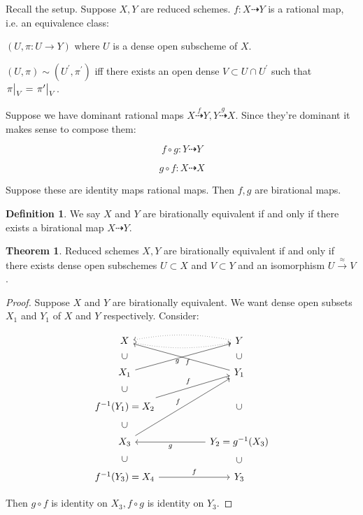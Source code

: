 \documentclass{article}
\theoremstyle{definition}
\newtheorem*{definition}{Definition}
\newtheorem{theorem}{Theorem}
\begin{document}
    Recall the setup. Suppose \(X, Y\) are reduced schemes. \(f: X \dashrightarrow Y\) is a rational map, i.e. an equivalence class:

    \((U, \pi: U \to Y)\) where \(U\) is a dense open subscheme of \(X\).

    \((U,\pi) \sim (U^{\prime}, \pi^{\prime})\) iff there exists an open dense \(V \subset U \cap U^{\prime}\) such that \(\eval{\pi}_{V} =\eval{\pi^{\prime}}_V\).

    Suppose we have dominant rational maps \(X \overset{f}{\dashrightarrow} Y, Y \overset{g}{\dashrightarrow} X\). Since they're dominant it makes sense to compose them:

    \[
        f \circ g \colon Y \dashrightarrow Y
    \]

    \[
        g \circ f\colon X \dashrightarrow X
    \]

    Suppose these are identity maps rational maps. Then \(f,g\) are birational maps.

    \begin{definition}
        We say \(X\) and \(Y\) are birationally equivalent if and only if there exists a birational map \(X \dashrightarrow Y\).
    \end{definition}

    \begin{theorem}
        Reduced schemes \(X, Y\) are birationally equivalent if and only if there exists dense open subschemes \(U \subset X\) and \(V \subset Y\) and an isomorphism \(U \xrightarrow{\approx} V\).
    \end{theorem}

    \begin{proof}
        Suppose \(X\) and \(Y\) are birationally equivalent. We want dense open subsets \(X_1\) and \(Y_1\) of \(X\) and \(Y\) respectively. Consider:
        
        \[
            \begin{tikzcd}[column sep = huge]
                X \ar[r, dotted, bend right = 10] & Y \ar[l, dotted, bend right = 10] \\
                X_1 \ar[u, "\subset", phantom, sloped] \ar[ru, "f"'] & Y_1 \ar[u, "\subset", phantom, sloped] \ar[ul,"g"] \\
                f^{-1} (Y_1)=X_2 \ar[u, "\subset", phantom, sloped] \ar[ru, "f"] \\ X_3 \ar[u, "\subset", phantom, sloped] \ar[ruu, "f"] & Y_2 = g ^{-1} (X_3) \ar[uu, "\subset", phantom, sloped]  \ar[l,"g"] \\ f ^{-1} (Y_3) \ar[u, "\subset", phantom, sloped] = X_4 \ar[r,"f"] & Y_3 \ar[u, "\subset", phantom, sloped]
            \end{tikzcd}
        \]

        Then \(g \circ f\) is identity on \(X_3 , f \circ g\) is identity on \(Y_3\).
    \end{proof}
\end{document}
